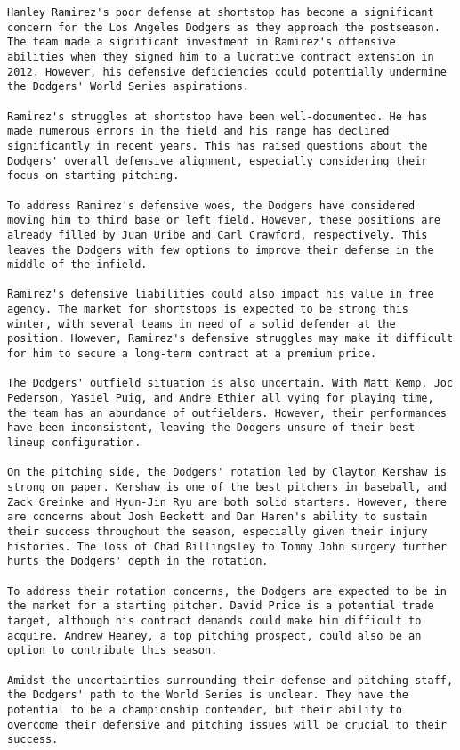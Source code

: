 \begin{lstlisting}
Hanley Ramirez's poor defense at shortstop has become a significant concern for the Los Angeles Dodgers as they approach the postseason. The team made a significant investment in Ramirez's offensive abilities when they signed him to a lucrative contract extension in 2012. However, his defensive deficiencies could potentially undermine the Dodgers' World Series aspirations.

Ramirez's struggles at shortstop have been well-documented. He has made numerous errors in the field and his range has declined significantly in recent years. This has raised questions about the Dodgers' overall defensive alignment, especially considering their focus on starting pitching.

To address Ramirez's defensive woes, the Dodgers have considered moving him to third base or left field. However, these positions are already filled by Juan Uribe and Carl Crawford, respectively. This leaves the Dodgers with few options to improve their defense in the middle of the infield.

Ramirez's defensive liabilities could also impact his value in free agency. The market for shortstops is expected to be strong this winter, with several teams in need of a solid defender at the position. However, Ramirez's defensive struggles may make it difficult for him to secure a long-term contract at a premium price.

The Dodgers' outfield situation is also uncertain. With Matt Kemp, Joc Pederson, Yasiel Puig, and Andre Ethier all vying for playing time, the team has an abundance of outfielders. However, their performances have been inconsistent, leaving the Dodgers unsure of their best lineup configuration.

On the pitching side, the Dodgers' rotation led by Clayton Kershaw is strong on paper. Kershaw is one of the best pitchers in baseball, and Zack Greinke and Hyun-Jin Ryu are both solid starters. However, there are concerns about Josh Beckett and Dan Haren's ability to sustain their success throughout the season, especially given their injury histories. The loss of Chad Billingsley to Tommy John surgery further hurts the Dodgers' depth in the rotation.

To address their rotation concerns, the Dodgers are expected to be in the market for a starting pitcher. David Price is a potential trade target, although his contract demands could make him difficult to acquire. Andrew Heaney, a top pitching prospect, could also be an option to contribute this season.

Amidst the uncertainties surrounding their defense and pitching staff, the Dodgers' path to the World Series is unclear. They have the potential to be a championship contender, but their ability to overcome their defensive and pitching issues will be crucial to their success.

\end{lstlisting}

